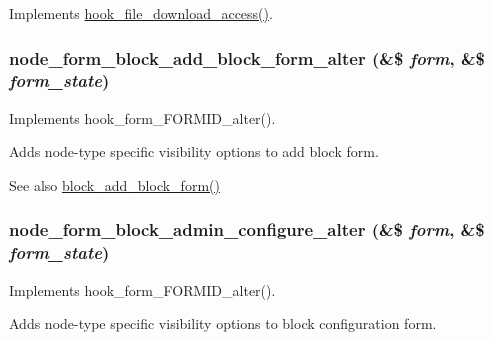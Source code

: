 \label{node_8module_adba6b7e58eca64bcca36f8cc40597f45}
Implements \hyperlink{file_8api_8php_ae72c8feceec1072762bffc3ba020aa2a}{hook\_\-file\_\-download\_\-access()}. \hypertarget{node_8module_a73bfd97257bcdd429f8fab27ec5dbcea}{
\subsubsection[{node\_\-form\_\-block\_\-add\_\-block\_\-form\_\-alter}]{\setlength{\rightskip}{0pt plus 5cm}node\_\-form\_\-block\_\-add\_\-block\_\-form\_\-alter (\&\$ {\em form}, \/  \&\$ {\em form\_\-state})}}
\label{node_8module_a73bfd97257bcdd429f8fab27ec5dbcea}
Implements hook\_\-form\_\-FORMID\_\-alter().

Adds node-\/type specific visibility options to add block form.

\begin{DoxySeeAlso}{See also}
\hyperlink{group__forms_ga974d0d9820f12e9a2ce5ae328d0ccdc5}{block\_\-add\_\-block\_\-form()} 
\end{DoxySeeAlso}
\hypertarget{node_8module_aa7774912602cb998d0ab075802165345}{
\subsubsection[{node\_\-form\_\-block\_\-admin\_\-configure\_\-alter}]{\setlength{\rightskip}{0pt plus 5cm}node\_\-form\_\-block\_\-admin\_\-configure\_\-alter (\&\$ {\em form}, \/  \&\$ {\em form\_\-state})}}
\label{node_8module_aa7774912602cb998d0ab075802165345}
Implements hook\_\-form\_\-FORMID\_\-alter().

Adds node-\/type specific visibility options to block configuration form.

